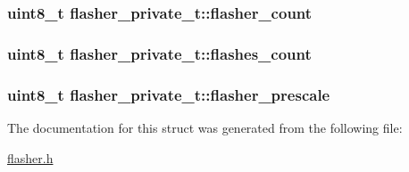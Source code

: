\hypertarget{structflasher__private__t_d64f71430b08b1983e5ce7b93bfa435f}{
\subsubsection{\setlength{\rightskip}{0pt plus 5cm}uint8\_\-t {\bf flasher\_\-private\_\-t::flasher\_\-count}}}
\label{structflasher__private__t_d64f71430b08b1983e5ce7b93bfa435f}


\hypertarget{structflasher__private__t_d420dea019064d7426aa55a1a57693d5}{
\subsubsection{\setlength{\rightskip}{0pt plus 5cm}uint8\_\-t {\bf flasher\_\-private\_\-t::flashes\_\-count}}}
\label{structflasher__private__t_d420dea019064d7426aa55a1a57693d5}


\hypertarget{structflasher__private__t_5ad162cba01cb2e4797b6257208d1f43}{
\subsubsection{\setlength{\rightskip}{0pt plus 5cm}uint8\_\-t {\bf flasher\_\-private\_\-t::flasher\_\-prescale}}}
\label{structflasher__private__t_5ad162cba01cb2e4797b6257208d1f43}




The documentation for this struct was generated from the following file:\begin{CompactItemize}
\item 
\hyperlink{flasher_8h}{flasher.h}\end{CompactItemize}
